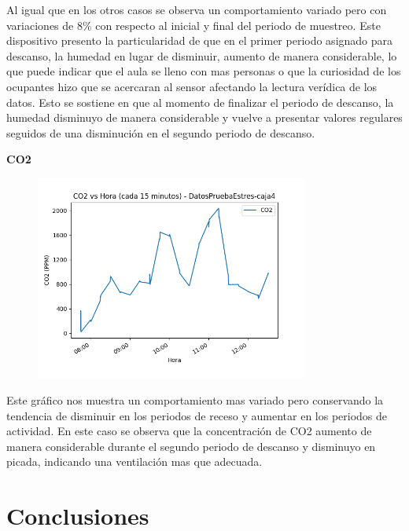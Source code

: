 \documentclass{templateNote}
\begin{document}
\begin{tcolorbox}
    Al igual que en los otros casos se observa un comportamiento variado pero con variaciones de 8\% con respecto al inicial y final del periodo de muestreo. Este dispositivo presento la particularidad de que en el primer periodo asignado para descanso, la humedad en lugar de disminuir, aumento de manera considerable, lo que puede indicar que el aula se lleno con mas personas o que la curiosidad de los ocupantes hizo que se acercaran al sensor afectando la lectura verídica de los datos. Esto se sostiene en que al momento de finalizar el periodo de descanso, la humedad disminuyo de manera considerable y vuelve a presentar valores regulares seguidos de una disminución en el segundo periodo de descanso.
\end{tcolorbox}

\newpage
\textbf{CO2}
\begin{figure}[H]
    \centering
    \includegraphics[width=0.8\textwidth]{img/DatosPruebaEstres-caja4_co2_vs_hora_15min.png}
\end{figure}

\begin{tcolorbox}
    Este gráfico nos muestra un comportamiento mas variado pero conservando la tendencia de disminuir en los periodos de receso y aumentar en los periodos de actividad. En este caso se observa que la concentración de CO2 aumento de manera considerable durante el segundo periodo de descanso y disminuyo en picada, indicando una ventilación mas que adecuada.
\end{tcolorbox}

\newpage
\section{Conclusiones}
\end{document}
